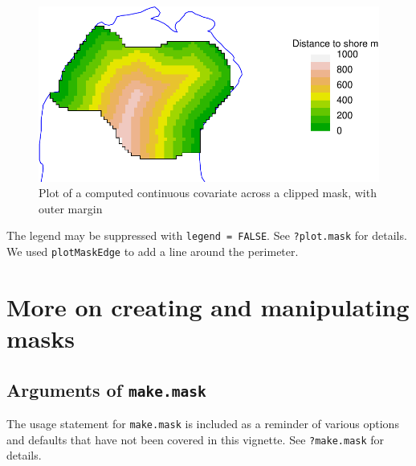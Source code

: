 \documentclass[
]{book}
\begin{document}
\begin{figure}

{\centering \includegraphics{SECRbook_files/figure-latex/plotmask-1} 

}

\caption{Plot of a computed continuous covariate across a clipped mask, with outer margin}\label{fig:plotmask}
\end{figure}

The legend may be suppressed with \texttt{legend\ =\ FALSE}. See \texttt{?plot.mask} for details. We used \texttt{plotMaskEdge} to add a line around the perimeter.

\section{More on creating and manipulating masks}\label{more-on-creating-and-manipulating-masks}

\subsection{\texorpdfstring{Arguments of \texttt{make.mask}}{Arguments of make.mask}}\label{arguments-of-make.mask}

The usage statement for \texttt{make.mask} is included as a reminder of various options and defaults that have not been covered in this vignette. See \texttt{?make.mask} for details.
\end{document}
